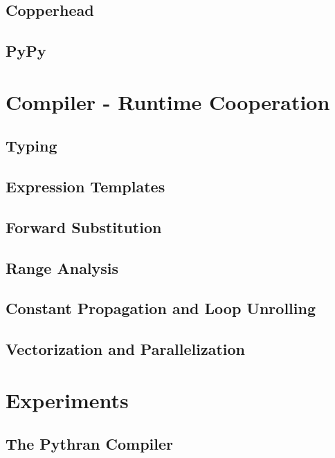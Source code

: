 \documentclass[10pt, preprint]{sigplanconf}
\begin{document}
\subsection{Copperhead}
\cite{copperhead2011}

\subsection{PyPy}
\cite{pypy2009}

\section{Compiler - Runtime Cooperation}
\label{sec:pythran}

\subsection{Typing}

\subsection{Expression Templates}

\cite{expression_templates, et2012}

\subsection{Forward Substitution}

\subsection{Range Analysis}

\subsection{Constant Propagation and Loop Unrolling}

\subsection{Vectorization and Parallelization}

\cite{esterie2012boost, pyhpc2013, wpmvp2014}

\section{Experiments}
\label{sec:xp}

\subsection{The Pythran Compiler}
\cite{pythran2013,isocxx11}
\end{document}

